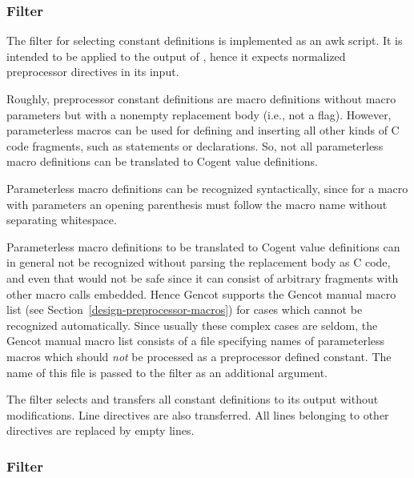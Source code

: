 \subsubsection{Filter }

The filter for selecting constant definitions is implemented as an awk script. It is intended to be applied 
to the output of , hence it expects normalized preprocessor directives in its input.

Roughly, preprocessor constant definitions are macro definitions without macro parameters but with a 
nonempty replacement body (i.e., not a flag). However, parameterless macros can be used for defining
and inserting all other kinds of C code fragments, such as statements or declarations. So, not all
parameterless macro definitions can be translated to Cogent value definitions.

Parameterless macro definitions can be recognized syntactically, since for a macro with parameters 
an opening parenthesis must follow the macro name without separating whitespace. 

Parameterless macro definitions to be translated to Cogent value definitions can in general not be 
recognized without parsing the replacement body as C code, and even that would not be safe since 
it can consist of arbitrary fragments with other macro calls embedded. Hence Gencot supports the Gencot
manual macro list (see Section~\ref{design-preprocessor-macros})
for cases which cannot be recognized automatically. Since usually these complex cases
are seldom, the Gencot manual macro list consists of a file specifying names of parameterless macros which
should \textit{not} be processed as a preprocessor defined constant. The name of this file is 
passed to the filter  as an additional argument.

The filter selects and transfers all constant definitions to its output without modifications. Line directives 
are also transferred. All lines belonging to other directives are replaced by empty lines.

\subsubsection{Filter }

